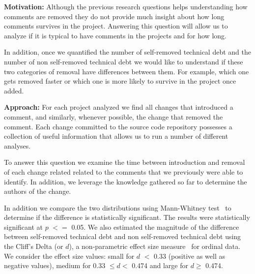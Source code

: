 


\vspace{2mm}
\noindent\rqiii

\noindent \textbf{Motivation:} Although the previous research questions helps understanding how \SATD comments are removed they do not provide much insight about how long \SATD comments survives in the project. Answering this question will allow us to analyze if it is typical to have \SATD comments in the projects and for how long.  

In addition, once we quantified the number of self-removed technical debt and the number of non self-removed technical debt we would like to understand if these two categories of removal have differences between them. For example, which one gets removed faster or which one is more likely to survive in the project once added. 

\vspace{1mm}
\noindent \textbf{Approach:} For each project analyzed we find all changes that introduced a \SATD comment, and similarly, whenever possible, the change that removed the \SATD comment. Each change committed to the source code repository possesses a collection of useful information  that allows us to run a number of different analyses. 

To answer this question we examine the time between introduction and removal of each change related related to the \SATD comments that we previously were able to identify. In addition, we leverage the knowledge gathered so far to determine the authors of the change. 


In addition we compare the two distributions using Mann-Whitney test~\cite{} to determine if the difference is statistically significant. The results were statistically significant at $p$ $<$$=$ 0.05. We also estimated the magnitude of the difference
between self-removed technical debt and non self-removed technical debt using the Cliff's Delta (or $d$), a
non-parametric effect size measure~\cite{} for ordinal data. We consider the effect size values: small for $d$ $<$ 0.33 (positive as well as negative values),
medium for 0.33  $\leq d<$ 0.474 and large for $d \geq$ 0.474.




